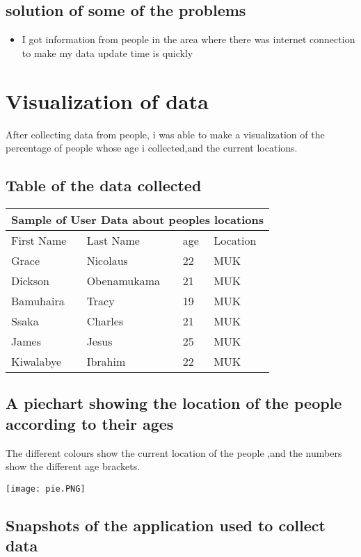 \documentclass{article}
\begin{document}
\subsection{solution of some of the problems}
\begin{itemize}
\item{I got information from people in the area where there was internet connection to make my data update time is quickly}
\end{itemize}

\section{Visualization of data}
After collecting data from people, i was able to make a visualization of the percentage of people whose age i collected,and the current locations.

\subsection{Table  of the data collected}
\begin{tabular}{ |p{3cm}||p{3cm}|p{3cm}|p{3cm}|  }
 \hline
 \multicolumn{4}{|c|}{ Sample of User Data about peoples locations} \\
 \hline
 First Name  & Last Name & age & Location\\
 \hline
 Grace  & Nicolaus    & 22 & MUK\\
 Dickson&   Obenamukama  & 21   &MUK\\
 Bamuhaira &Tracy & 19&  MUK\\
 Ssaka    &Charles & 21&  MUK\\
 James&  Jesus  & 25& MUK\\
 Kiwalabye & Ibrahim & 22  &MUK\\
 \hline
\end{tabular}


\subsection{A piechart showing the location of the people according to their ages }
The different colours show the current location of the people ,and the numbers show the different age brackets.


\texttt{[image: pie.PNG]}



\subsection{Snapshots of the application used to collect data}
\end{document}
